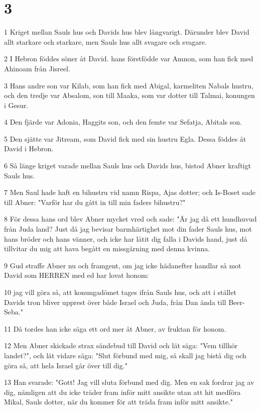 \chapter{3}

\par 1 Kriget mellan Sauls hus och Davids hus blev långvarigt. Därunder blev David allt starkare och starkare, men Sauls hus allt svagare och svagare.
\par 2 I Hebron föddes söner åt David. hans förstfödde var Amnon, som han fick med Ahinoam från Jisreel.
\par 3 Hans andre son var Kilab, som han fick med Abigal, karmeliten Nabals hustru, och den tredje var Absalom, son till Maaka, som var dotter till Talmai, konungen i Gesur.
\par 4 Den fjärde var Adonia, Haggits son, och den femte var Sefatja, Abitals son.
\par 5 Den sjätte var Jitream, som David fick med sin hustru Egla. Dessa föddes åt David i Hebron.
\par 6 Så länge kriget varade mellan Sauls hus och Davids hus, bistod Abner kraftigt Sauls hus.
\par 7 Men Saul hade haft en bihustru vid namn Rispa, Ajas dotter; och Is-Boset sade till Abner: "Varför har du gått in till min faders bihustru?"
\par 8 För dessa hans ord blev Abner mycket vred och sade: "Är jag då ett hundhuvud från Juda land? Just då jag bevisar barmhärtighet mot din fader Sauls hus, mot hans bröder och hans vänner, och icke har låtit dig falla i Davids hand, just då tillvitar du mig att hava begått en missgärning med denna kvinna.
\par 9 Gud straffe Abner nu och framgent, om jag icke hädanefter handlar så mot David som HERREN med ed har lovat honom:
\par 10 jag vill göra så, att konungadömet tages ifrån Sauls hus, och att i stället Davids tron bliver upprest över både Israel och Juda, från Dan ända till Beer-Seba."
\par 11 Då tordes han icke säga ett ord mer åt Abner, av fruktan för honom.
\par 12 Men Abner skickade strax sändebud till David och lät säga: "Vem tillhör landet?", och lät vidare säga: "Slut förbund med mig, så skall jag bistå dig och göra så, att hela Israel går över till dig."
\par 13 Han svarade: "Gott! Jag vill sluta förbund med dig. Men en sak fordrar jag av dig, nämligen att du icke träder fram inför mitt ansikte utan att hit medföra Mikal, Sauls dotter, när du kommer för att träda fram inför mitt ansikte."
